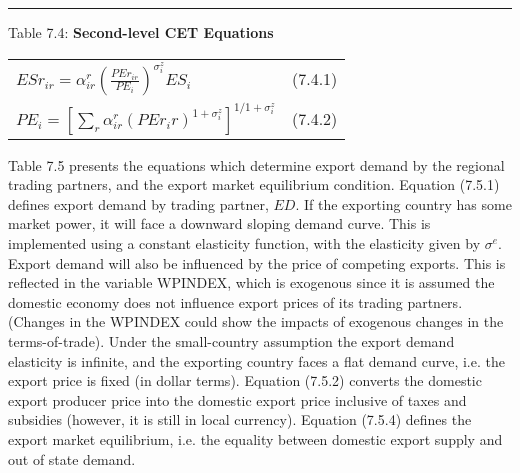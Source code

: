 \documentclass{article}
\begin{document}
\noindent\rule{\linewidth}{0.4pt}
\begin{center}
\begin{large}
{\centering Table 7.4: \textbf{Second-level CET Equations} \par}


\begin{tabular}{>{\raggedright}p{} l}


$ESr_{ir} = \alpha^r_{ir}\left(\frac{PEr_{ir}}{PE_i}\right)^{\sigma^z_i}ES_i$ & (7.4.1)\\[15pt]

$PE_i = \left[\displaystyle\sum_r\alpha^r_{ir}\left(PEr_ir\right)^{1+{\sigma^z_i}}\right]^{1/{1+{\sigma^z_i}}}$ & (7.4.2)\\[20pt]

\hline
\end{tabular}
\end{large}
\end{center}

Table 7.5 presents the equations which determine export demand by the regional trading partners, and the export market equilibrium condition. Equation (7.5.1) defines export demand by trading partner, $ED$. If the exporting country has some market power, it will face a downward sloping demand curve. This is implemented using a constant elasticity function, with the elasticity given by $\sigma^e$. Export demand will also be influenced by the price of competing exports. This is reflected in the variable WPINDEX, which is exogenous since it is assumed the domestic economy does not influence export prices of its trading partners. (Changes in the WPINDEX could show the impacts of exogenous changes in the terms-of-trade). Under the small-country assumption the export demand elasticity is infinite, and the exporting country faces a flat demand curve, i.e. the export price is fixed (in dollar terms). Equation (7.5.2) converts the domestic export producer price into the domestic export price inclusive of taxes and subsidies (however, it is still in local currency). Equation (7.5.4) defines the export market equilibrium, i.e. the equality between domestic export supply and out of state demand.
\end{document}
